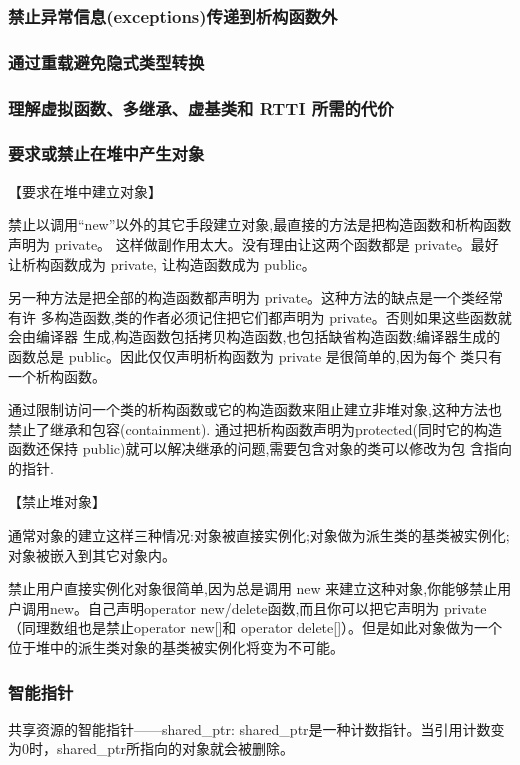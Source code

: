 \subsubsection{禁止异常信息(exceptions)传递到析构函数外}
\subsubsection{通过重载避免隐式类型转换}
\subsubsection{理解虚拟函数、多继承、虚基类和 RTTI 所需的代价}
\subsubsection{要求或禁止在堆中产生对象}

【要求在堆中建立对象】

禁止以调用“new”以外的其它手段建立对象,最直接的方法是把构造函数和析构函数声明为 private。 这样做副作用太大。没有理由让这两个函数都是 private。最好让析构函数成为 private, 让构造函数成为 public。

另一种方法是把全部的构造函数都声明为 private。这种方法的缺点是一个类经常有许 多构造函数,类的作者必须记住把它们都声明为 private。否则如果这些函数就会由编译器 生成,构造函数包括拷贝构造函数,也包括缺省构造函数;编译器生成的函数总是 public。因此仅仅声明析构函数为 private 是很简单的,因为每个 类只有一个析构函数。

通过限制访问一个类的析构函数或它的构造函数来阻止建立非堆对象,这种方法也禁止了继承和包容(containment). 通过把析构函数声明为protected(同时它的构造函数还保持 public)就可以解决继承的问题,需要包含对象的类可以修改为包
含指向的指针.

【禁止堆对象】

通常对象的建立这样三种情况:对象被直接实例化;对象做为派生类的基类被实例化; 对象被嵌入到其它对象内。

禁止用户直接实例化对象很简单,因为总是调用 new 来建立这种对象,你能够禁止用户调用new。自己声明operator new/delete函数,而且你可以把它声明为 private（同理数组也是禁止operator new[]和 operator delete[]）。但是如此对象做为一个位于堆中的派生类对象的基类被实例化将变为不可能。

\subsubsection{智能指针}
共享资源的智能指针——shared_ptr: shared_ptr是一种计数指针。当引用计数变为0时，shared_ptr所指向的对象就会被删除。

